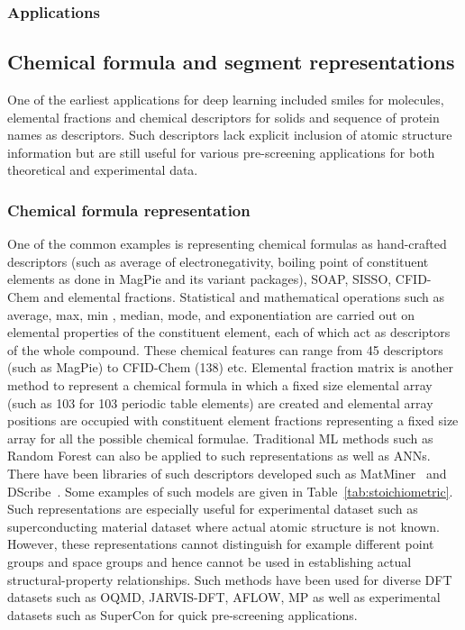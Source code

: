 \documentclass[pdflatex,sn-mathphys]{sn-jnl}%
\theoremstyle{thmstyleone}%
\theoremstyle{thmstyletwo}%
\theoremstyle{thmstylethree}%
\begin{document}
\subsubsection{Applications}

\subsection{Chemical formula and segment representations}\label{sec:stoichiometric}
One of the earliest applications for deep learning included smiles for molecules, elemental fractions and chemical descriptors for solids and sequence of protein names as descriptors. Such descriptors lack explicit inclusion of atomic structure information but are still useful for various pre-screening applications for both theoretical and experimental data. 

\subsubsection{Chemical formula representation}

One of the common examples is representing chemical formulas as hand-crafted descriptors (such as average of electronegativity, boiling point of constituent elements as done in MagPie and its variant packages), SOAP, SISSO, CFID-Chem and elemental fractions. Statistical and mathematical operations such as average, max, min , median, mode, and exponentiation are carried out on elemental properties of the constituent element, each of which act as descriptors of the whole compound. These chemical features can range from 45 descriptors (such as MagPie) to CFID-Chem (138) etc. Elemental fraction matrix is another method to represent a chemical formula in which a fixed size elemental array (such as 103 for 103 periodic table elements) are created and elemental array positions are occupied with constituent element fractions representing a fixed size array for all the possible chemical formulae. Traditional ML methods such as Random Forest can also be applied to such representations as well as ANNs. There have been libraries of such descriptors developed such as MatMiner~\cite{ward2018matminer} and DScribe~\cite{}. Some examples of such models are given in Table~\ref{tab:stoichiometric}. Such representations are especially useful for experimental dataset such as superconducting material dataset where actual atomic structure is not known. However, these representations cannot distinguish for example different point groups and space groups and hence cannot be used in establishing actual structural-property relationships. Such methods have been used for diverse DFT datasets such as OQMD, JARVIS-DFT, AFLOW, MP as well as experimental datasets such as SuperCon for quick pre-screening applications.
\end{document}
